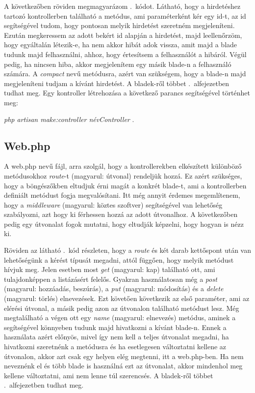 \documentclass[]{thesis-ekf}
\theoremstyle{definition}
\theoremstyle{remark}
\begin{document}
			A következőben röviden megmagyarázom .~kódot. Látható, hogy a hirdetéshez tartozó kontrollerben található a metódus, ami paraméterként kér egy id-t, az id segítségével tudom, hogy pontosan melyik hirdetést szeretném megjeleníteni. Ezután megkeressem az adott bekért id alapján a hirdetést, majd leellenőrzöm, hogy egyáltalán létezik-e, ha nem akkor hibát adok vissza, amit majd a blade tudunk majd felhasználni, ahhoz, hogy értesítsem a felhasználót a hibáról. Végül pedig, ha nincsen hiba, akkor megjelenítem egy másik blade-n a felhasználó számára. A \emph{compact} nevű metódusra, azért van szükségem, hogy a blade-n majd megjeleníteni tudjam a kívánt hirdetést. A bladek-ről többet .~alfejezetben tudhat meg.  Egy kontroller létrehozása a következő parancs segítségével történhet meg:
		\begin{center} 
			\emph{php artisan make:controller névController} .
		\end{center}
		  
	\subsection{Web.php}
		A web.php nevű fájl, arra szolgál, hogy a kontrollerekben elkészített különböző metódusokhoz \emph{route}-t (magyarul: útvonal) rendeljük hozzá. Ez azért szükséges, hogy a böngészőkben eltudjuk érni magát a konkrét blade-t, ami a kontrollerben definiált metódust fogja megvalósítani. Itt még annyit érdemes megemlítenem, hogy a \emph{middleware} (magyarul: köztes szoftver) segítségével van lehetőség szabályozni, azt hogy ki férhessen hozzá az adott útvonalhoz. A következőben pedig egy útvonalat fogok mutatni, hogy eltudják képzelni, hogy hogyan is nézz ki.
	
		
	
		Röviden az látható .~kód részleten, hogy a \emph{route} és két darab kettőspont után van lehetőségünk a kérést típusát megadni, attól függően, hogy melyik metódust hívjuk meg. Jelen esetben most \emph{get} (magyarul: kap) található ott, ami tulajdonképpen a listázásért felelős. Gyakran használatosan még a \emph{post} (magyarul: hozzáadás, beszúrás), a \emph{put} (magyarul: módosítás) és a \emph{delete} (magyarul: törlés) elnevezések. Ezt követően következik az első paraméter, ami az elérési útvonal, a másik pedig azon az útvonalon található metódust lesz. Még megtalálható a végen ott egy \emph{name} (magyarul: elnevezés) metódus, aminek a segítségével könnyeben tudunk majd hivatkozni a kívánt blade-n. Ennek a használata azért előnyös, mivel így nem kell a teljes útvonalat megadni, ha hivatkozni szeretnénk a metódusra és ha esetlegesen változtatni kellene az útvonalon, akkor azt csak egy helyen elég megtenni, itt a web.php-ben. Ha nem neveznénk el és több blade is használná ezt az útvonalat, akkor mindenhol meg kellene változtatni, ami nem lenne túl szerencsés. A bladek-ről többet .~alfejezetben tudhat meg.
		
\end{document}
